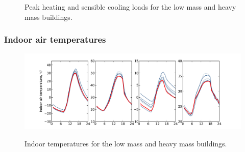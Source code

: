 \begin{figure}[ht]
\caption{Peak heating and sensible cooling loads for the low mass and heavy mass buildings.} 
\end{figure}

\subsubsection{Indoor air temperatures}

\begin{figure}[ht]
\includegraphics[width=\textwidth]{figures/Temp_BESTEST.pdf}
\label{fig:Temp_BESTEST}
\caption{Indoor temperatures for the low mass and heavy mass buildings.} 
\end{figure}


